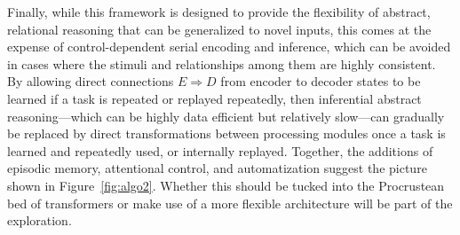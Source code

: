 Finally, while this framework is designed to provide the flexibility of abstract, relational reasoning that can be generalized to novel inputs, this comes at the expense of control-dependent serial encoding and inference, which can be avoided in cases where the stimuli and relationships among them are highly consistent. By allowing
direct connections $E \Rightarrow D$ from encoder to decoder states to be learned if a task is repeated or replayed repeatedly, then inferential abstract reasoning---which can be highly data efficient but relatively slow---can gradually be replaced by direct transformations between processing modules once a task is learned and repeatedly used, or internally replayed.  Together, the additions of episodic memory, attentional control, and automatization 
suggest the picture shown in Figure~\ref{fig:algo2}. Whether this should be tucked into the Procrustean bed of transformers or make use of a more flexible architecture will be part of the exploration.



